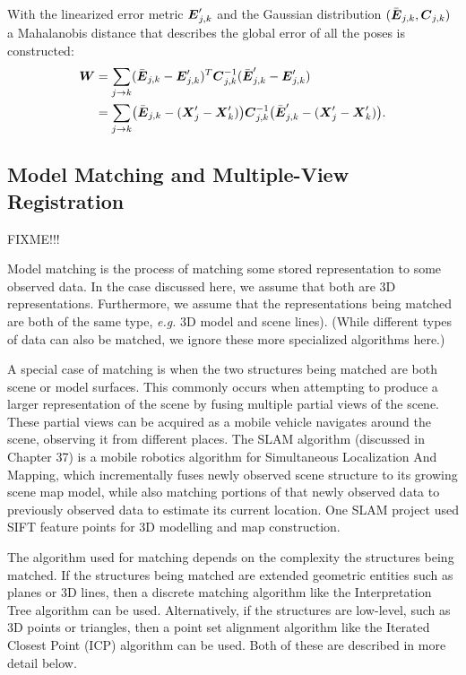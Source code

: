 \documentclass[twocolumn,oneside]{book}
\newcommand{\V}[1]{\vector{#1}}  %
\newcommand{\M}[1]{\V{#1}}    %
\begin{document}
With the linearized
error metric ${\V E}'_{j,k}$ and the Gaussian distribution $(\bar{\V E}_{j,k}, {\M
C}_{j,k})$ a Mahalanobis distance that describes the global error of all the
poses is constructed:
\begin{align}
{\M W} &= \sum_{j \rightarrow k} (\bar{\V E}_{j,k} - {\V E}'_{j,k})^{T} {\M C}^{-1}_{j,k}
(\bar{\V E}'_{j,k} - {\V E}'_{j,k}) \nonumber \\
&=  \sum_{j \rightarrow k}
\bigl(\bar{\V E}_{j,k} - ({\V X}'_j - {\V X}'_k)\bigr)
{\M C}^{-1}_{j,k} \bigl(\bar{\V E}'_{j,k} - ({\V X}'_j - {\V X}'_k)\bigr).\label{eq:u1}
\end{align}






\subsection{Model Matching and Multiple-View Registration\label{match31}} 

FIXME!!!

Model matching is the process of matching some stored representation
to some observed data. In the case discussed here, we assume that
both are 3D representations.
Furthermore, we assume that the representations being matched are both of
the same type, {\it e.g.} 3D model and scene lines).
(While different types of data can also be matched, we ignore these
more specialized algorithms here.)

A special case of matching is when the two structures being matched are
both scene or model surfaces.
This commonly occurs when attempting to produce a larger 
representation of the scene by fusing multiple partial views of the scene.
These partial views can be acquired as a mobile vehicle navigates
around the scene, observing it from different places.
The SLAM algorithm \cite{thrun} (discussed in Chapter 37) is a 
mobile robotics algorithm for Simultaneous Localization And Mapping,
which incrementally fuses newly observed scene structure to its
growing scene map model, while also matching portions of that newly observed
data to previously observed data to estimate its current location.
One SLAM project \cite{little} used SIFT feature points for 3D modelling and map construction.

The algorithm used for matching depends on the complexity
the structures being matched.
If the structures being matched are extended geometric entities such as
planes or 3D lines, then a discrete matching algorithm like the
Interpretation Tree algorithm \cite{grimson} can be used.
Alternatively, if the structures are low-level, such as 3D points 
or triangles, then a point set alignment algorithm like the 
 Iterated Closest Point (ICP) algorithm \cite{besl2} can be used.
Both of these are described in more detail below.
\end{document}
